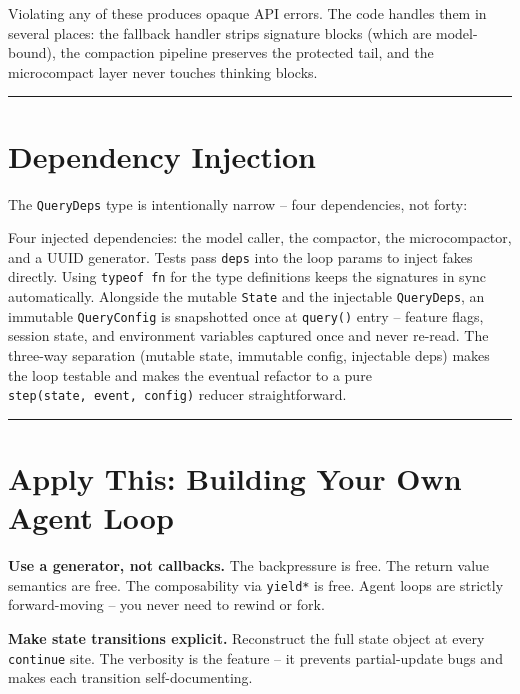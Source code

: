 \documentclass[
  english,
  11pt,
  letterpaper,
]{book}
\begin{document}
Violating any of these produces opaque API errors. The code handles them
in several places: the fallback handler strips signature blocks (which
are model-bound), the compaction pipeline preserves the protected tail,
and the microcompact layer never touches thinking blocks.

\begin{center}\rule{0.5\linewidth}{0.5pt}\end{center}

\section{Dependency Injection}\label{dependency-injection}

The \texttt{QueryDeps} type is intentionally narrow -- four
dependencies, not forty:

Four injected dependencies: the model caller, the compactor, the
microcompactor, and a UUID generator. Tests pass \texttt{deps} into the
loop params to inject fakes directly. Using \texttt{typeof\ fn} for the
type definitions keeps the signatures in sync automatically. Alongside
the mutable \texttt{State} and the injectable \texttt{QueryDeps}, an
immutable \texttt{QueryConfig} is snapshotted once at \texttt{query()}
entry -- feature flags, session state, and environment variables
captured once and never re-read. The three-way separation (mutable
state, immutable config, injectable deps) makes the loop testable and
makes the eventual refactor to a pure
\texttt{step(state,\ event,\ config)} reducer straightforward.

\begin{center}\rule{0.5\linewidth}{0.5pt}\end{center}

\section{Apply This: Building Your Own Agent
Loop}\label{apply-this-building-your-own-agent-loop}

\textbf{Use a generator, not callbacks.} The backpressure is free. The
return value semantics are free. The composability via \texttt{yield*}
is free. Agent loops are strictly forward-moving -- you never need to
rewind or fork.

\textbf{Make state transitions explicit.} Reconstruct the full state
object at every \texttt{continue} site. The verbosity is the feature --
it prevents partial-update bugs and makes each transition
self-documenting.
\end{document}
